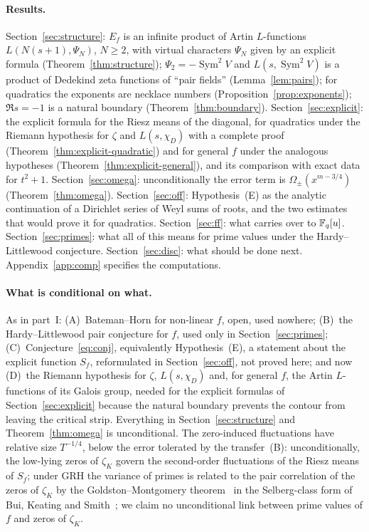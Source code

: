 \documentclass[11pt,a4paper]{article}
\theoremstyle{remark}\newtheorem{remark}[theorem]{Remark}
\newcommand{\Sym}{\operatorname{Sym}}\newcommand{\Res}{\operatorname*{Res}}
\begin{document}
\paragraph{Results.} Section~\ref{sec:structure}: $E_f$ is an infinite product of Artin $L$-functions
$L(N(s+1),\Psi_N)$, $N\ge2$, with virtual characters $\Psi_N$ given by an explicit formula
(Theorem~\ref{thm:structure}); $\Psi_2=-\Sym^2V$ and $L(s,\Sym^2V)$ is a product of Dedekind zeta functions of
``pair fields'' (Lemma~\ref{lem:pairs}); for quadratics the exponents are necklace numbers
(Proposition~\ref{prop:exponents}); $\Re s=-1$ is a natural boundary (Theorem~\ref{thm:boundary}).
Section~\ref{sec:explicit}: the explicit formula for the Riesz means of the diagonal, for quadratics under
the Riemann hypothesis for $\zeta$ and $L(s,\chi_D)$ with a complete proof (Theorem~\ref{thm:explicit-quadratic})
and for general $f$ under the analogous hypotheses (Theorem~\ref{thm:explicit-general}), and its comparison
with exact data for $t^2+1$. Section~\ref{sec:omega}: unconditionally the error term is $\Omega_\pm(x^{m-3/4})$
(Theorem~\ref{thm:omega}). Section~\ref{sec:off}: Hypothesis~(E) as the analytic continuation of a
Dirichlet series of Weyl sums of roots, and the two estimates that would prove it for quadratics.
Section~\ref{sec:ff}: what carries over to $\mathbb{F}_q[u]$. Section~\ref{sec:primes}: what all of this means for
prime values under the Hardy--Littlewood conjecture. Section~\ref{sec:disc}: what should be done next.
Appendix~\ref{app:comp} specifies the computations.

\paragraph{What is conditional on what.} As in part~I: (A)~Bateman--Horn for non-linear $f$, open, used
nowhere; (B)~the Hardy--Littlewood pair conjecture for $f$, used only in Section~\ref{sec:primes};
(C)~Conjecture~\eqref{eq:conj}, equivalently Hypothesis~(E), a statement about the explicit function $S_f$,
reformulated in Section~\ref{sec:off}, not proved here; and now (D)~the Riemann hypothesis for $\zeta$,
$L(s,\chi_D)$ and, for general $f$, the Artin $L$-functions of its Galois group, needed for the explicit
formulas of Section~\ref{sec:explicit} because the natural boundary prevents the contour from leaving the
critical strip. Everything in Section~\ref{sec:structure} and Theorem~\ref{thm:omega} is unconditional.
The zero-induced fluctuations have relative size $T^{-1/4}$, below the error tolerated by the transfer~(B):
unconditionally, the low-lying zeros of $\zeta_K$ govern the second-order fluctuations of the Riesz means of
$S_f$; under GRH the variance of primes is related to the pair correlation of the zeros of $\zeta_K$ by the
Goldston--Montgomery theorem~\cite{GoldstonMontgomery1987} in the Selberg-class form of Bui, Keating and
Smith~\cite{BuiKeatingSmith2016}; we claim no unconditional link between prime values of $f$ and zeros of
$\zeta_K$.
\end{document}
